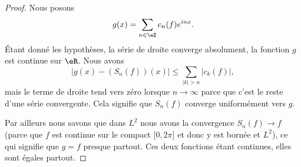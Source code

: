 \begin{proof}
	Nous posons
	\begin{equation}
		g(x)=\sum_{n\in \eZ}c_n(f) e^{inx}.
	\end{equation}
	Étant donné les hypothèses, la série de droite converge absolument, la fonction \( g\) est continue sur \( \eR\). Nous avons
	\begin{equation}
		\big| g(x)-(S_n(f))(x) \big|\leq \sum_{| k |> n}| c_k(f) |,
	\end{equation}
	mais le terme de droite tend vers zéro lorsque \( n\to \infty\) parce que c'est le reste d'une série convergente. Cela signifie que \( S_n(f)\) converge uniformément vers \( g\).

	Par ailleurs nous savons que dans \( L^2\) nous avons la convergence \( S_n(f)\to f\) (parce que \( f\) est continue sur le compact \( \mathopen[ 0 , 2\pi \mathclose]\) et donc y est bornée et \( L^2\)), ce qui signifie que \( g=f\) presque partout. Ces deux fonctions étant continues, elles sont égales partout.
\end{proof}

